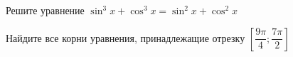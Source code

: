 \begin{ex}
	\begin{condition}
		\begin{enumcols}[label=\asbuk*)]
			\item Решите уравнение \( \sin^3 x +\cos^3 x = \sin^2 x + \cos^2 x  \)
			\item Найдите все корни уравнения, принадлежащие отрезку \( \left[\dfrac{9\pi}{4};\dfrac{7\pi}{2}\right] \)
		\end{enumcols}
	\end{condition}
\end{ex}